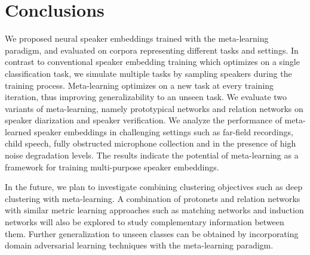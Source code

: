 \section{Conclusions}

We proposed neural speaker embeddings trained with the meta-learning paradigm, and evaluated on corpora representing different tasks and settings. 
In contrast to conventional speaker embedding training which optimizes on a single classification task, we simulate multiple tasks by sampling speakers during the training process. 
Meta-learning optimizes on a new task at every training iteration, thus improving generalizability to an unseen task.
We evaluate two variants of meta-learning, namely prototypical networks and relation networks on speaker diarization and speaker verification.
We analyze the performance of meta-learned speaker embeddings in challenging settings such as far-field recordings, child speech, fully obstructed microphone collection and in the presence of high noise degradation levels.
The results indicate the potential of meta-learning as a framework for training multi-purpose speaker embeddings.


In the future, we plan to investigate combining clustering objectives such as deep clustering \cite{hershey_dpcl2016, pmlr-v70-law17a} with meta-learning.
A combination of protonets and relation networks with similar metric learning approaches such as matching networks and induction networks will also be explored to study complementary information between them. Further generalization to unseen classes can be obtained by incorporating domain adversarial learning techniques with the meta-learning paradigm.
